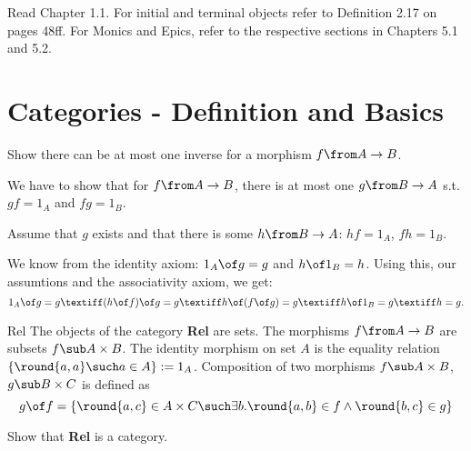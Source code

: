 \def\pathToRoot{../../}




\author{Sarah Mameche, Andreas Meyer, Leonhard Staut}

\begin{hint}
  Read Chapter 1.1. For initial and terminal objects refer to Definition 2.17 on pages 48ff. For Monics and Epics, refer to the respective sections in Chapters 5.1 and 5.2.
\end{hint}

\section{Categories - Definition and Basics}

\begin {exercise}
Show there can be at most one inverse for a morphism $f \from A \to B$.
\end{exercise}

\begin{answer}
  We have to show that for $f \from A \to B$, there is at most one $g
  \from B \to A$ s.t. $gf = 1_A$ and $fg = 1_B$.

  Assume that $g$ exists and that there is some $h \from B \to A$: $hf = 1_A$, $fh = 1_B$.

  We know from the identity axiom: $1_A \of g = g$ and $h \of 1_B = h$. Using this, our assumtions and the associativity axiom, we get:
 \[  1_A \of g = g \textiff (h \of f) \of g = g \textiff h \of (f \of g) = g \textiff h \of 1_B = g \textiff h=g. \]
\end{answer}

\begin {definition}{Rel}
The objects of the category \textbf{Rel} are sets. The morphisms $f \from A \to B$ are subsets $f \sub A \times B$.
The identity morphism on set $A$ is the equality relation $\{\round{a,a} \such a \in A\} := 1_A$.
Composition of two morphisms $f \sub A \times B$, $g \sub B \times C$ is defined as
\[ g \of f = \{ \round{a, c} \in A \times C \such \exists b. \round{a, b} \in f \land \round{b, c} \in g\} \]
\end{definition}

\begin {exercise}
Show that \textbf{Rel} is a category.
\end{exercise}

